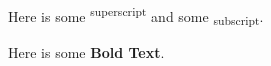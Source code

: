 Here is some \textsuperscript{superscript} and some \textsubscript{subscript}.

Here is some \textbf{Bold Text}.
